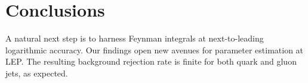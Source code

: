 \section{Conclusions}\label{sec:conclusions}

A natural next step is to harness Feynman integrals at next-to-leading
logarithmic accuracy. Our findings open new avenues for parameter
estimation at LEP. The resulting background rejection rate is finite for
both quark and gluon jets, as expected.

